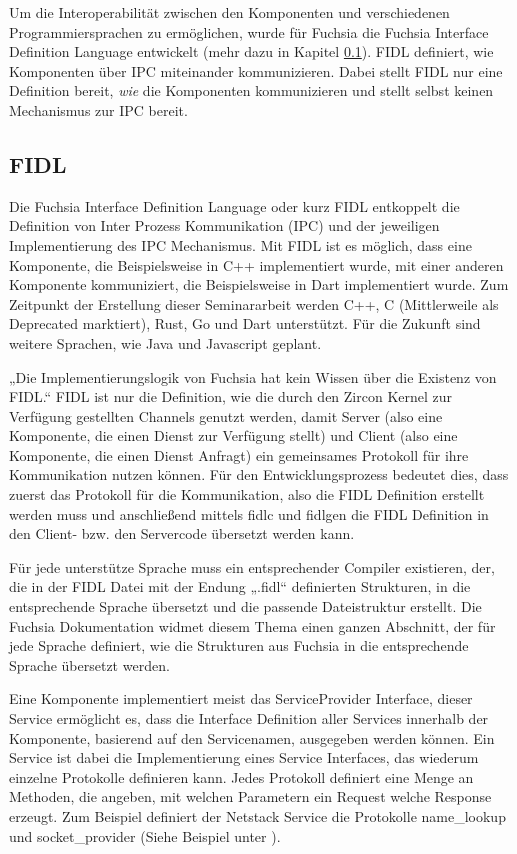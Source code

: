 \documentclass[a4paper]{scrartcl}
\begin{document}
Um die Interoperabilität zwischen den Komponenten und verschiedenen Programmiersprachen zu ermöglichen, wurde für Fuchsia die Fuchsia Interface Definition Language entwickelt (mehr dazu in Kapitel \ref{sec:FIDL}). FIDL definiert, wie Komponenten über IPC miteinander kommunizieren. Dabei stellt FIDL nur eine Definition bereit, \textit{wie} die Komponenten kommunizieren und stellt selbst keinen Mechanismus zur IPC bereit.

\subsection{FIDL}
\label{sec:FIDL}
Die Fuchsia Interface Definition Language oder kurz FIDL entkoppelt die Definition von Inter Prozess Kommunikation (IPC) und der jeweiligen Implementierung des IPC Mechanismus. Mit FIDL ist es möglich, dass eine Komponente, die Beispielsweise in C++ implementiert wurde, mit einer anderen Komponente kommuniziert, die Beispielsweise in Dart implementiert wurde. Zum Zeitpunkt der Erstellung dieser Seminararbeit werden C++, C (Mittlerweile als Deprecated marktiert), Rust, Go und Dart unterstützt. Für die Zukunft sind weitere Sprachen, wie Java und Javascript geplant. \cite{Fuchsia.FIDLOverview}

„Die Implementierungslogik von Fuchsia hat kein Wissen über die Existenz von FIDL.“ \cite{Fuchsia.FIDLOverview} FIDL ist nur die Definition, wie die durch den Zircon Kernel zur Verfügung gestellten Channels genutzt werden, damit Server (also eine Komponente, die einen Dienst zur Verfügung stellt) und Client (also eine Komponente, die einen Dienst Anfragt) ein gemeinsames Protokoll für ihre Kommunikation nutzen können. Für den Entwicklungsprozess bedeutet dies, dass zuerst das Protokoll für die Kommunikation, also die FIDL Definition erstellt werden muss und anschließend mittels fidlc und fidlgen die FIDL Definition in den Client- bzw. den Servercode übersetzt werden kann.

Für jede unterstütze Sprache muss ein entsprechender Compiler existieren, der, die in der FIDL Datei mit der Endung „.fidl“ definierten Strukturen, in die entsprechende Sprache übersetzt und die passende Dateistruktur erstellt. Die Fuchsia Dokumentation widmet diesem Thema einen ganzen Abschnitt, der für jede Sprache definiert, wie die Strukturen aus Fuchsia in die entsprechende Sprache übersetzt werden.\cite{Fuchsia.FIDLBindings.Overview}

Eine Komponente implementiert meist das ServiceProvider Interface, dieser Service ermöglicht es, dass die Interface Definition aller Services innerhalb der Komponente, basierend auf den Servicenamen, ausgegeben werden können. Ein Service ist dabei die Implementierung eines Service Interfaces, das wiederum einzelne Protokolle definieren kann. Jedes Protokoll definiert eine Menge an Methoden, die angeben, mit welchen Parametern ein Request welche Response erzeugt.  Zum Beispiel definiert der Netstack Service die Protokolle name\_lookup und socket\_provider (Siehe Beispiel unter \cite{Fuchsia.Components.Servies}).
\end{document}
